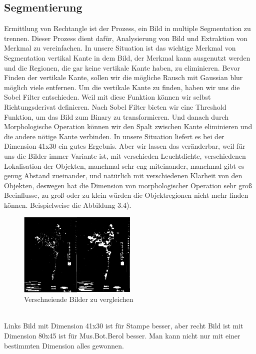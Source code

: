 \documentclass[10pt,a4paper]{report}
\begin{document}
\subsection{Segmentierung}
Ermittlung von Rechtangle ist der Prozess, ein Bild in multiple Segmentation zu trennen. Dieser Prozess dient dafür, Analysierung von Bild und Extraktion von Merkmal zu vereinfachen.\cite{5} 
In unsere Situation ist das wichtige Merkmal von Segmentation vertikal Kante in dem Bild, der Merkmal kann ausgenutzt werden und die Regionen, die gar keine vertikale Kante haben, zu eliminieren. 
Bevor Finden der vertikale Kante, sollen wir die mögliche Rausch mit Gaussian blur möglich viele entfernen. Um die vertikale Kante zu finden, haben wir uns die Sobel Filter entschieden. Weil mit diese Funktion können wir selbst Richtungsderivat definieren. 
Nach Sobel Filter bieten wir eine Threshold Funktion, um das Bild zum Binary zu transformieren. Und danach durch Morphologische Operation können wir den Spalt zwischen Kante eliminieren und die andere nötige Kante verbinden. In unsere Situation liefert es bei der Dimension 41x30 ein gutes Ergebnis. Aber wir lassen das veränderbar, weil für uns die Bilder immer Variante ist, mit verschieden Leuchtdichte, verschiedenen Lokalisation der Objekten, manchmal sehr eng miteinander, manchmal gibt es genug Abstand zueinander, und natürlich mit verschiedenen Klarheit von den Objekten, deswegen hat die Dimension von morphologischer Operation sehr groß Beeinflusse, zu groß oder zu klein würden die Objektregionen nicht mehr finden können. Beispielweise die Abbildung 3.4).\\
\begin{figure}[htbp] 
	\centering
	\includegraphics[width=0.5\textwidth]{SVMPre.png}
	\caption{Verschneiende Bilder zu vergleichen}
	\label{fig:Bild 5}
\end{figure}\\
Links Bild mit Dimension 41x30 ist für Stampe besser, aber recht Bild ist mit Dimension 80x45 ist für Mus.Bot.Berol besser. Man kann nicht nur mit einer bestimmten Dimension alles gewonnen.
\end{document}
